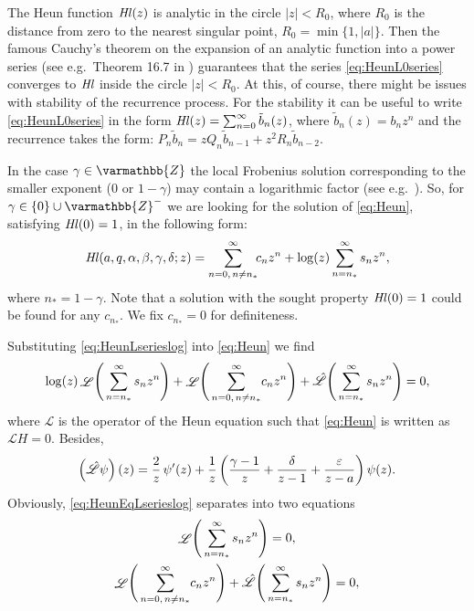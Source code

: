 \documentclass[11pt]{article}
\newcommand{\MF}[1]{\mathop{#1}\nolimits}
\newcommand{\Zz}{\varmathbb{Z}}%
\def\Heun{H}%
\def\HeunL{\MF{\textit{Hl\/}}}%
\def\bz{\tilde{b}}%
\def\nsp{n_*}%
\def\Lkr{\mathscr{L}}%
\begin{document}
The Heun function
$\HeunL(z)$ is analytic in the circle $|z|<R_0$, where $R_0$ is the distance
from zero to the nearest singular point, $R_0=\min\{1,|a|\}$. Then the famous
Cauchy's theorem on the expansion of an analytic function into a power series
(see e.g.\ Theorem 16.7 in \cite[Part~I]{Markushevich1977}) guarantees that the
series \eqref{eq:HeunL0series} converges to $\HeunL$ inside the circle
$|z|<R_0$. At this, of course, there might be issues with stability of the
recurrence process. For the stability it can be useful to write
\eqref{eq:HeunL0series} in the form $\HeunL(z)=\sum_{n=0}^{\infty}\bz_n(z)$,
where $\bz_n(z)=b_n z^n$ and the recurrence takes the form: $P_n \bz_n=z Q_n
\bz_{n-1}+z^2 R_n \bz_{n-2}$.

In the case $\gamma\in\Zz$ the local Frobenius solution corresponding to the
smaller exponent ($0$ or $1-\gamma$) may contain a logarithmic factor (see e.g.\
\cite{Kamke1944}). So, for $\gamma\in\{0\}\cup\Zz^-$ we are looking for the
solution of \eqref{eq:Heun}, satisfying $\HeunL(0)=1$, in the following form:
\begin{equation}
\HeunL(a,q,\alpha,\beta,\gamma,\delta;z)=\sum_{n=0,\,n\neq\nsp}^{\infty}\!\!c_n
z^n +\log(z)\sum_{n=\nsp}^{\infty}s_n z^n,
\label{eq:HeunLserieslog}
\end{equation}
where $\nsp=1-\gamma$. Note that a solution with the sought property
$\HeunL(0)=1$ could be found for any $c_{\nsp}$. We fix $c_{\nsp}=0$ for
definiteness.

Substituting \eqref{eq:HeunLserieslog} into \eqref{eq:Heun} we find
\begin{equation}
\log(z)\MF{\Lkr}\Biggl(\,\sum_{n=\nsp}^\infty s_n z^n\Biggr)+
\MF{\Lkr}\Biggl(\,\sum_{n=0,\,n\neq\nsp}^\infty\! c_n z^n\Biggr)+
\MF{\Hat{\Lkr}}\Biggl(\,\sum_{n=\nsp}^\infty s_n z^n\Biggr)=0,
\label{eq:HeunEqLserieslog}
\end{equation}
where $\Lkr$ is the operator of the Heun equation such that \eqref{eq:Heun} is
written as $\Lkr\Heun=0$. Besides,
\[
\left(\Hat{\Lkr}\psi\right)(z)=\frac2z\MF{\psi'}(z)+\frac1z\left(
\frac{\gamma-1}{z}+\frac{\delta}{z-1}+\frac{\varepsilon}{z-a}\right)\MF{\psi}(z).
\]
Obviously, \eqref{eq:HeunEqLserieslog} separates into two equations
\begin{gather}
\MF{\Lkr}\Biggl(\,\sum_{n=\nsp}^\infty s_n
z^n\Biggr)=0,\label{eq:HeunEqLserieslog1}\\
\MF{\Lkr}\Biggl(\,\sum_{n=0,\,n\neq\nsp}^\infty\! c_n z^n\Biggr)+
\MF{\Hat{\Lkr}}\Biggl(\,\sum_{n=\nsp}^\infty s_n z^n\Biggr)=0,
\label{eq:HeunEqLserieslog2}
\end{gather}
\end{document}
